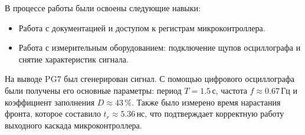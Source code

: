 В процессе работы были освоены следующие навыки:
\begin{itemize}
    \item Работа с документацией и доступом к регистрам микроконтроллера.
    \item Работа с измерительным оборудованием: подключение щупов осциллографа и снятие характеристик сигнала.
\end{itemize}

На выводе PG7 был сгенерирован сигнал. С помощью цифрового осциллографа были получены его основные параметры: период $T=1.5$\,с, частота $f \approx 0.67$\,Гц и коэффициент заполнения $D \approx 43\,\%$. Также было измерено время нарастания фронта, которое составило $t_r \approx 5.36$\,нс, что подтверждает корректную работу выходного каскада микроконтроллера.
